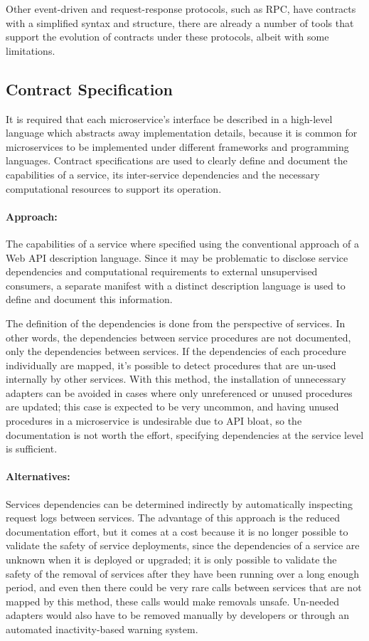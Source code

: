 Other event-driven and request-response protocols, such as RPC, have contracts with a simplified
syntax and structure, there are already a number of tools that support the evolution of contracts
under these protocols, albeit with some limitations.

\subsection{Contract Specification} %
\label{sec:contract_specification}

It is required that each microservice’s interface be
described in a high-level language which abstracts away implementation details, because it is common
for microservices to be implemented under different frameworks and programming languages.
Contract specifications are used to clearly define and document the capabilities of a service, its inter-service dependencies and the necessary computational resources to support its operation.

\paragraph{Approach:}
The capabilities of a service where specified using the conventional approach of a Web API description language.
Since it may be problematic to disclose service dependencies and computational requirements to external unsupervised consumers,
a separate manifest with a distinct description language is used to define and document this information.

The definition of the dependencies is done from the perspective of services.
In other words, the dependencies between service procedures are not documented, only the dependencies between services.
If the dependencies of each procedure individually are mapped, it's possible to detect procedures that are un-used internally by other services.
With this method, the installation of unnecessary adapters can be avoided in cases where only unreferenced or unused procedures are updated;
this case is expected to be very uncommon, and having unused procedures in a microservice is undesirable due to API bloat,
so the documentation is not worth the effort, specifying dependencies at the service level is sufficient.

\paragraph{Alternatives:}
Services dependencies can be determined indirectly by automatically inspecting request logs between services.
The advantage of this approach is the reduced documentation effort, but it comes at a cost because
it is no longer possible to validate the safety of service deployments, since the dependencies of a service are unknown when it is deployed or upgraded;
it is only possible to validate the safety of the removal of services after they have been running over a long enough period,
and even then there could be very rare calls between services that are not mapped by this method, these calls would make removals unsafe.
Un-needed adapters would also have to be removed manually by developers or through an automated inactivity-based warning system.

